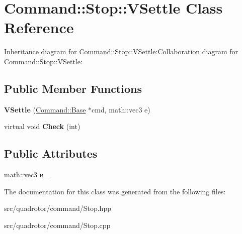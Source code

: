 \hypertarget{classCommand_1_1Stop_1_1VSettle}{
\section{Command::Stop::VSettle Class Reference}
\label{classCommand_1_1Stop_1_1VSettle}
}
Inheritance diagram for Command::Stop::VSettle:Collaboration diagram for Command::Stop::VSettle:\subsection*{Public Member Functions}
\begin{DoxyCompactItemize}
\item 
\hypertarget{classCommand_1_1Stop_1_1VSettle_a07fd40d6e22d9368ccd2a471f5ba3f07}{
{\bfseries VSettle} (\hyperlink{classCommand_1_1Base}{Command::Base} $\ast$cmd, math::vec3 e)}
\label{classCommand_1_1Stop_1_1VSettle_a07fd40d6e22d9368ccd2a471f5ba3f07}

\item 
\hypertarget{classCommand_1_1Stop_1_1VSettle_aa8632c09f01cb9427d33571001522fa8}{
virtual void {\bfseries Check} (int)}
\label{classCommand_1_1Stop_1_1VSettle_aa8632c09f01cb9427d33571001522fa8}

\end{DoxyCompactItemize}
\subsection*{Public Attributes}
\begin{DoxyCompactItemize}
\item 
\hypertarget{classCommand_1_1Stop_1_1VSettle_a34a092cedcae2ea8bda7ccc75028345a}{
math::vec3 {\bfseries e\_\-}}
\label{classCommand_1_1Stop_1_1VSettle_a34a092cedcae2ea8bda7ccc75028345a}

\end{DoxyCompactItemize}


The documentation for this class was generated from the following files:\begin{DoxyCompactItemize}
\item 
src/quadrotor/command/Stop.hpp\item 
src/quadrotor/command/Stop.cpp\end{DoxyCompactItemize}
